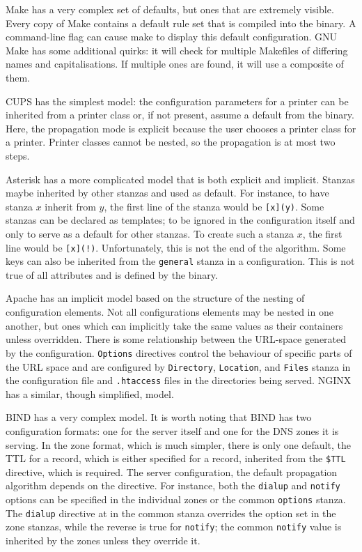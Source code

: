 \documentclass[letterpaper,twocolumn,10pt]{article}
\begin{document}
Make has a very complex set of defaults, but ones that are extremely visible. Every copy of Make contains a default rule set that is compiled into the binary. A command-line flag can cause make to display this default configuration. GNU Make has some additional quirks: it will check for multiple Makefiles of differing names and capitalisations. If multiple ones are found, it will use a composite of them.

CUPS has the simplest model: the configuration parameters for a printer can be inherited from a printer class or, if not present, assume a default from the binary. Here, the propagation mode is explicit because the user chooses a printer class for a printer. Printer classes cannot be nested, so the propagation is at most two steps.

Asterisk has a more complicated model that is both explicit and implicit. Stanzas maybe inherited by other stanzas and used as default. For instance, to have stanza $x$ inherit from $y$, the first line of the stanza would be \verb![x](y)!. Some stanzas can be declared as templates; to be ignored in the configuration itself and only to serve as a default for other stanzas. To create such a stanza $x$, the first line would be \verb#[x](!)#. Unfortunately, this is not the end of the algorithm. Some keys can also be inherited from the \texttt{general} stanza in a configuration. This is not true of all attributes and is defined by the binary.

Apache has an implicit model based on the structure of the nesting of configuration elements. Not all configurations elements may be nested in one another, but ones which can implicitly take the same values as their containers unless overridden. There is some relationship between the URL-space generated by the configuration. \texttt{Options} directives control the behaviour of specific parts of the URL space and are configured by \texttt{Directory}, \texttt{Location}, and \texttt{Files} stanza in the configuration file and \verb!.htaccess! files in the directories being served. NGINX has a similar, though simplified, model.

BIND has a very complex model. It is worth noting that BIND has two configuration formats: one for the server itself and one for the DNS zones it is serving. In the zone format, which is much simpler, there is only one default, the TTL for a record, which is either specified for a record, inherited from the \texttt{\$TTL} directive, which is required. The server configuration, the default propagation algorithm depends on the directive. For instance, both the \texttt{dialup}  and \texttt{notify} options can be specified in the individual zones or the common \texttt{options} stanza. The \texttt{dialup} directive at in the common stanza overrides the option set in the zone stanzas, while the reverse is true for \texttt{notify}; the common \texttt{notify} value is inherited by the zones unless they override it.
\end{document}
